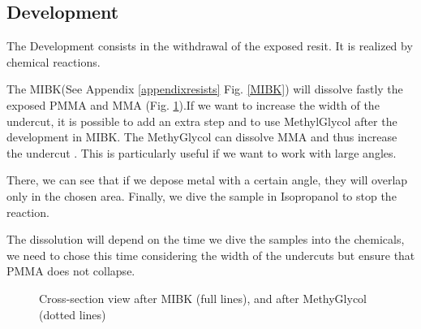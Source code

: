         \subsection{Development}
        
            \label{development}
            The Development consists in the withdrawal of the exposed resit. It is realized by chemical reactions.
            
            
            
            The MIBK(See Appendix \ref{appendixresists} Fig. \ref{MIBK}) will dissolve fastly the exposed PMMA and MMA (Fig. \ref{aprèsMIBK}).If we want to increase the width of the undercut, it is possible to add an extra step and to use MethylGlycol after the development in MIBK. The MethyGlycol can dissolve MMA and thus increase the undercut \cite{methylglycol}. This is particularly useful if we want to work with large angles.
            
            There, we can see that if we depose metal with a certain angle, they will overlap only in the chosen area. Finally, we dive the sample in Isopropanol to stop the reaction.

The dissolution will depend on the time we dive the samples into the chemicals, we need to chose this time considering the width of the undercuts but ensure that PMMA does not collapse.
            
            \begin{figure}
                \centering
                \caption{Cross-section view after MIBK (full lines), and after MethyGlycol (dotted lines)}
                \label{aprèsMIBK}
            \end{figure}
            

